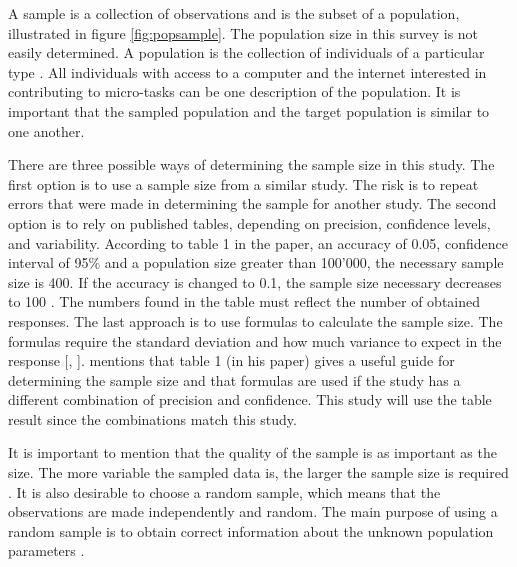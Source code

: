 A sample is a collection of observations and is the subset of a population, illustrated in figure \ref{fig:popsample}. The population size in this survey is not easily determined. A population is the collection of individuals of a particular type \citep{Walpole2012}. All individuals with access to a computer and the internet interested in contributing to micro-tasks can be one description of the population. It is important that the sampled population and the target population is similar to one another.

There are three possible ways of determining the sample size in this study. The first option is to use a sample size from a similar study. The risk is to repeat errors that were made in determining the sample for another study. The second option is to rely on published tables, depending on precision, confidence levels, and variability. According to table 1 in the \cite{Israel1992} paper, an accuracy of 0.05, confidence interval of 95\% and a population size greater than 100'000, the necessary sample size is 400. If the accuracy is changed to 0.1, the sample size necessary decreases to 100 \citep{Israel1992}. The numbers found in the table must reflect the number of obtained responses. The last approach is to use formulas to calculate the sample size. The formulas require the standard deviation and how much variance to expect in the response [\citep{Israel1992}, \citep{Smith2013}]. \cite{Israel1992} mentions that table 1 (in his paper) gives a useful guide for determining the sample size and that formulas are used if the study has a different combination of precision and confidence. This study will use the table result since the combinations match this study.

It is important to mention that the quality of the sample is as important as the size. The more variable the sampled data is, the larger the sample size is required \citep{Israel1992}. It is also desirable to choose a random sample, which means that the observations are made independently and random. The main purpose of using a random sample is to obtain correct information about the unknown population parameters \citep{Walpole2012}. 




